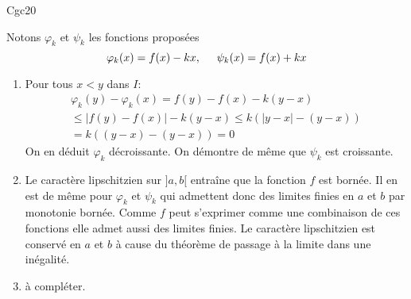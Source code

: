 \begin{tiny}Cgc20\end{tiny} Notons $\varphi_k$ et $\psi_k$ les fonctions proposées
\begin{displaymath}
  \varphi_k(x) = f(x) -kx, \hspace{0.5cm} \psi_k(x) = f(x) +kx
\end{displaymath}
\begin{enumerate}
  \item Pour tous $x<y$ dans $I$:
\begin{multline*}
\varphi_k(y) - \varphi_k(x) = f(y)-f(x) - k(y-x)\\
\leq \left|f(y)-f(x)\right| - k(y-x)
\leq k\left( \left|y-x\right| -(y-x)\right)\\
= k\left( (y-x) -(y-x)\right) = 0
\end{multline*}
On en déduit $\varphi_k$ décroissante.\newline
On démontre de même que $\psi_k$ est croissante.

  \item Le caractère lipschitzien sur $]a,b[$ entraîne que la fonction $f$ est bornée. Il en est de même pour $\varphi_k$ et $\psi_k$ qui admettent donc des limites finies en $a$ et $b$ par monotonie bornée. Comme $f$ peut s'exprimer comme une combinaison de ces fonctions elle admet aussi des limites finies. Le caractère lipschitzien est conservé en $a$ et $b$ à cause du théorème de passage à la limite dans une inégalité.
  
  \item à compléter.
\end{enumerate}

